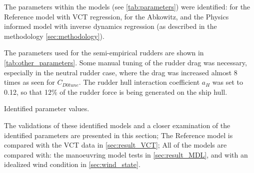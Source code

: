 The parameters within the models (see \autoref{tab:parameters}) were identified: for the Reference model with VCT regression, for the Abkowitz, and the Physics informed model with inverse dynamics regression (as described in the methodology \autoref{sec:methodology}). 

The parameters used for the semi-empirical rudders are shown in \autoref{tab:other_parameters}. Some manual tuning of the rudder drag was necessary, especially in the neutral rudder case, where the drag was increased almost 8 times as seen for $C_{D0tune}$. The rudder hull interaction coefficient $a_H$ was set to 0.12, so that 12\% of the rudder force is being generated on the ship hull.
\begin{table}[h]
    \centering
    \caption{Identified parameter values.}
    \label{tab:parameters}
\end{table}

The validations of these identified models and a closer examination of the identified parameters are presented in this section; The Reference model is compared with the VCT data in \autoref{sec:result_VCT}; All of the models are compared with: the manoeuvring model tests in \autoref{sec:result_MDL}, and with an idealized wind condition in \autoref{sec:wind_state}.